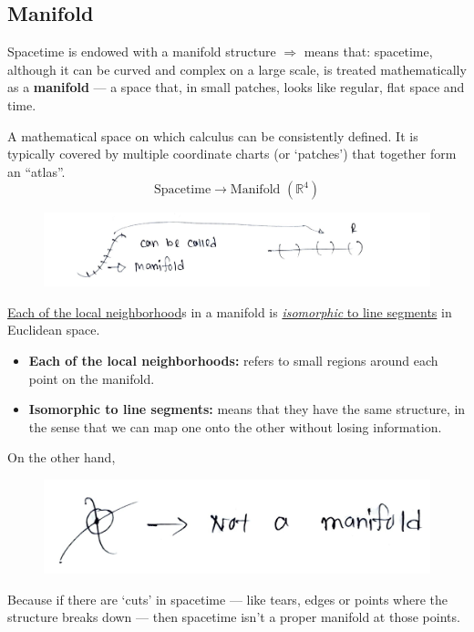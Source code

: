 \documentclass[14pt]{article} %
\begin{document}
\subsection{Manifold}
Spacetime is endowed with a manifold structure $\Rightarrow$ means that: spacetime, although it can be curved and complex on a large scale, is treated mathematically as a \textbf{manifold} — a space that, in small patches, looks like regular, flat space and time.
\begin{tcolorbox}[proofbox, title=\textbf{Definition}]
A mathematical space on which calculus can be consistently defined. It is typically covered by multiple coordinate charts (or `patches') that together form an ``atlas''.
\[
\text{Spacetime} \rightarrow \text{Manifold } (\mathbb{R}^4)
\]
\end{tcolorbox}
\vspace{-0.5cm}
\begin{figure}[H]
\centering
\includegraphics[width=0.9\linewidth]{L(-1)_1.jpg}
\caption*{}
\end{figure}
\vspace{-0.9cm}
\noindent
\underline{Each of the local neighborhood}s in a manifold is \underline{\textit{isomorphic} to line segments} in Euclidean space.
\begin{itemize}
  \item \textbf{Each of the local neighborhoods:} refers to small regions around each point on the manifold.
  \item \textbf{Isomorphic to line segments:} means that they have the same structure, in the sense that we can map one onto the other without losing information.
\end{itemize}
On the other hand,
\begin{figure}[H]
\centering
\includegraphics[width=0.5\linewidth]{L(-1)_2.jpg}
\caption*{}
\end{figure}
\vspace{-0.9cm}
\noindent
Because if there are `cuts' in spacetime — like tears, edges or points where the structure breaks down — then spacetime isn't a proper manifold at those points.
\end{document}
